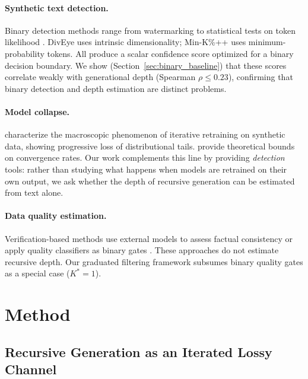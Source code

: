 \documentclass[11pt,a4paper]{article}
\begin{document}
\paragraph{Synthetic text detection.}
Binary detection methods range from watermarking \citep{kirchenbauer2023watermark} to statistical tests on token likelihood \citep{mitchell2023detectgpt,hans2024binoculars}. DivEye \citep{tulchinskii2024diveye} uses intrinsic dimensionality; Min-K\%++ \citep{zhang2024minkpp} uses minimum-probability tokens. All produce a scalar confidence score optimized for a binary decision boundary. We show (Section~\ref{sec:binary_baseline}) that these scores correlate weakly with generational depth (Spearman $\rho \leq 0.23$), confirming that binary detection and depth estimation are distinct problems.

\paragraph{Model collapse.}
\citet{shumailov2024model} characterize the macroscopic phenomenon of iterative retraining on synthetic data, showing progressive loss of distributional tails. \citet{dohmatob2024model} provide theoretical bounds on convergence rates. Our work complements this line by providing \emph{detection} tools: rather than studying what happens when models are retrained on their own output, we ask whether the depth of recursive generation can be estimated from text alone.

\paragraph{Data quality estimation.}
Verification-based methods use external models to assess factual consistency \citep{feng2024factuality} or apply quality classifiers as binary gates \citep{wettig2024qurating}. These approaches do not estimate recursive depth. Our graduated filtering framework subsumes binary quality gates as a special case ($K^*{=}1$).

\section{Method}
\label{sec:method}

\subsection{Recursive Generation as an Iterated Lossy Channel}
\label{sec:theory}
\end{document}
